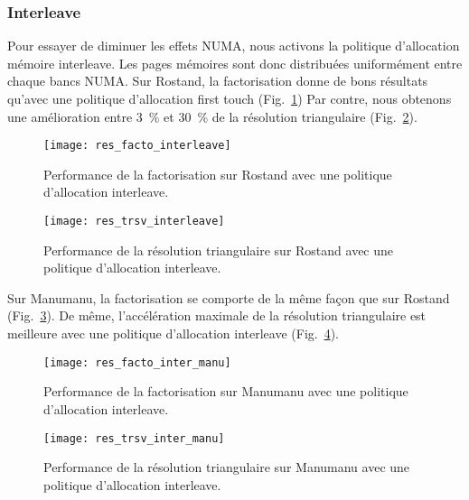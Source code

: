 \subsubsection{Interleave}
Pour essayer de diminuer les effets NUMA, nous activons la politique d'allocation mémoire interleave.
%
Les pages mémoires sont donc distribuées uniformément entre chaque bancs NUMA.
%
Sur Rostand, la factorisation donne de bons résultats qu'avec une politique d'allocation first touch (Fig.~\ref{fig:res_facto_inter_rostand})
%
Par contre, nous obtenons une amélioration entre 3~\% et 30~\% de la résolution triangulaire (Fig.~\ref{fig:res_trsv_inter_rostand}).

\begin{figure}[t!]
  \centering
  \texttt{[image: res\_facto\_interleave]}
  \caption{Performance de la factorisation sur Rostand avec une politique d'allocation interleave.}
  \label{fig:res_facto_inter_rostand}
\end{figure}


\begin{figure}[t!]
  \centering
  \texttt{[image: res\_trsv\_interleave]}
  \caption{Performance de la résolution triangulaire sur Rostand avec une politique d'allocation interleave.}
  \label{fig:res_trsv_inter_rostand}
\end{figure}

Sur Manumanu, la factorisation se comporte de la même façon que sur Rostand (Fig.~\ref{fig:res_facto_inter_manumanu}).
%
De même, l'accélération maximale de la résolution triangulaire est meilleure avec une politique d'allocation interleave (Fig.~\ref{fig:res_trsv_inter_manumanu}).


\begin{figure}[t!]
  \centering
  \texttt{[image: res\_facto\_inter\_manu]}
  \caption{Performance de la factorisation sur Manumanu avec une politique d'allocation interleave.}
  \label{fig:res_facto_inter_manumanu}
\end{figure}


\begin{figure}[t!]
  \centering
  \texttt{[image: res\_trsv\_inter\_manu]}
  \caption{Performance de la résolution triangulaire sur Manumanu avec une politique d'allocation interleave.}
  \label{fig:res_trsv_inter_manumanu}
\end{figure}
